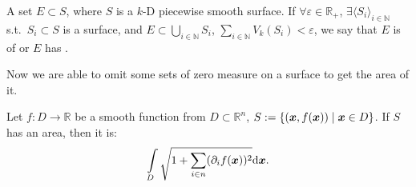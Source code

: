 \documentclass[openany]{book}
\begin{document}
\begin{definition}
	A set $E \subset S$, where $S$ is a $k$-D piecewise smooth surface. 
	If $\forall \varepsilon \in \mathbb R_+$, $\exists \langle S_i \rangle_{i \in \mathbb N}$ s.t.\ $S_i \subset S$ is a surface, and $E \subset \bigcup_{i \in \mathbb N} S_i$, $\sum_{i \in \mathbb N} V_k(S_i) < \varepsilon$, 
	we say that $E$ is of  or $E$ has .
\end{definition}

Now we are able to omit some sets of zero measure on a surface to get the area of it.

\begin{theorem}
	Let $f \colon D \to \mathbb R$ be a smooth function from $D \subset \mathbb R^n$, $S := \{(\boldsymbol{x}, f(\boldsymbol{x})) \mid \boldsymbol{x} \in D\}$. 
	If $S$ has an area, then it is:
	\begin{equation*}
		\int\limits_D \sqrt{1 + \sum_{i \in n} (\partial_i f(\boldsymbol{x}))^2} \mathrm{d} \boldsymbol{x}.
	\end{equation*} 
\end{theorem}
\end{document}
